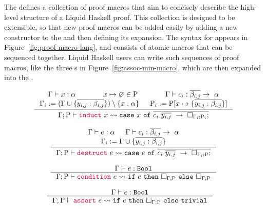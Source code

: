 The \LangA defines a collection of proof macros that aim to concisely
describe the high-level structure of a Liquid Haskell proof. This
collection is designed to be extensible, so that new proof macros can
be added easily by adding a new constructor to the \LangA and then
defining its expansion.  The syntax for \LangA appears in
Figure~\ref{fig:proof-macro-lang}, and consists of atomic macros that
can be sequenced together. Liquid Haskell users can write such
sequences of proof macros, like the three s in
Figure~\ref{fig:assoc-min-macro}, which are then expanded into the
\LangB.


\begin{figure*}
  \begin{minipage}{\textwidth}
    \[
    \begin{array}{c}
      \inference{
          \Gamma \vdash x : \alpha &&  x \mapsto \varnothing \in \Rho &&
          \Gamma \vdash c_i : \overline{\beta_{i,j}} \rightarrow ~ \alpha \\
          \Gamma_i := (\Gamma \cup \{\overline{y_{i,j}:\beta_{i,j}}\}) \setminus \{x:\alpha\} && 
          \Rho_i := \Rho[ x \mapsto \{\overline{y_{i,j}:\beta_{i,j}}\} ]
      }
      {\Gamma; \Rho 
  \vdash
  \macro{induct} ~ x
  \expandsTo 
  \MC{case} ~ x ~ \MC{of} ~ 
  \overline{
    c_i ~ \overline{y_{i,j}} ~ \rightarrow ~ 
    \macroHole
      {\Gamma_i}
      {\Rho_i};
  }}\\
  \\
  \inference{\Gamma \vdash e : \alpha &&
    \Gamma \vdash c_i : \overline{\beta_{i,j}} \rightarrow ~ \alpha \\
    \Gamma_i := \Gamma \cup \{\overline{y_{i,j}:\beta_{i,j}}\}
  }
  {\Gamma; \Rho
  \vdash
  \macro{destruct} ~ e
  \expandsTo 
  \MC{case} ~ e ~ \MC{of} ~
  \overline{
    c_i ~ \overline{y_{i,j}} ~ \rightarrow ~ 
    \macroHole
      {\Gamma_i}
      {\Rho};
  }}\\
  \\
  \inference{
    \Gamma \vdash e:\MC{Bool}
  }
  {
  \Gamma; \Rho
  \vdash
  \macro{condition} ~ e
  \expandsTo
  \MC{if} ~ e ~ \MC{then} ~ \macroHole{\Gamma}{\Rho} ~ \MC{else} ~ \macroHole{\Gamma}{\Rho}}\\
  \\
  \inference{
    \Gamma \vdash e:\MC{Bool}
  }
  {\Gamma; \Rho
  \vdash
  \macro{assert} ~ e
  \expandsTo
  \MC{if} ~ e ~ \MC{then} ~ \macroHole{\Gamma}{\Rho} ~ \MC{else} ~ \MC{trivial}} \quad

\end{array}\]
\end{minipage}
\end{figure*}
